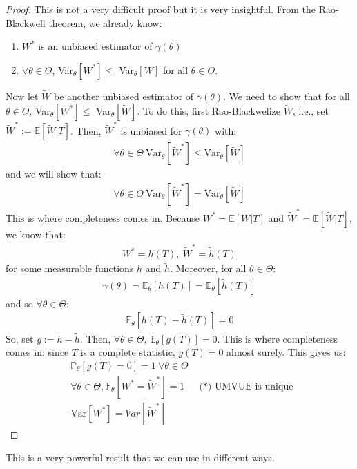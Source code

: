 \documentclass[11pt]{scrartcl}
\theoremstyle{definition}
\theoremstyle{remark}
\newcommand{\EX}[1]{\mathbb{E}\left[#1 \right]}
\newcommand{\EXth}[1]{\mathbb{E}_\theta \left[ #1 \right]}
\begin{document}
{\begin{proof}
	This is not a very difficult proof but it is very insightful. From the Rao-Blackwell theorem, we already know: 
	\begin{enumerate}[noitemsep]
		\item $W^*$ is an unbiased estimator of $\gamma ( \theta ) $
		\item $\forall \theta \in \Theta$, Var$_\theta [W^*] \leq $ Var$_\theta [W]$ for all $\theta \in \Theta$. 
	\end{enumerate}
	Now let $\widetilde{W}$ be another unbiased estimator of $\gamma ( \theta)$. We need to show that for all $\theta \in \Theta$, Var$_\theta [ W^*] \leq$ Var$_\theta [\widetilde{W} ]$. To do this, first Rao-Blackwelize $\widetilde{W}$, i.e., set $\widetilde{W}^* := \EX{ \widetilde{W} | T } $. Then, $\widetilde{W}^*$ is unbiased for $\gamma (\theta)$ with: 
	\begin{align*}
		\forall \theta \in \Theta\ \text{Var}_\theta [ \widetilde{W}^* ] \leq \text{Var}_\theta [ \widetilde{W} ]
	\end{align*}
	and we will show that: 
	\begin{align*}
		\forall \theta \in \Theta\ \text{Var}_\theta [ \widetilde{W}^*] =  \text{Var}_\theta [ \widetilde{W} ] 
	\end{align*}
	This is where completeness comes in. Because $W^* = \EX{W|T}$ and $\widetilde{W}^* = \EX{\widetilde{W} | T} $, we know that: 
	\begin{align*} 
		W^* = h(T),\ \widetilde{W}^* = \widetilde{h}(T) 
	\end{align*}
	for some measurable functions $h$ and $\widetilde{h}$. Moreover, for all $\theta \in \Theta$: 
	\begin{align*}
		\gamma(\theta) = \EXth{h(T)} = \EXth{\widetilde{h}(T)} 
	\end{align*}
	and so $\forall \theta \in \Theta$: 
	\begin{align*}
		\EXth{h(T) - \widetilde{h}(T)} = 0 
	\end{align*}
	So, set $g := h - \widetilde{h}$. Then, $\forall \theta \in \Theta$, $\EXth{g(T)} = 0$. This is where completeness comes in: since $T$ is a complete statistic, $g(T) = 0$ almost surely. This gives us: 
	\begin{align*}
		& \mathbb{P}_\theta [ g(T) = 0] = 1\ \forall \theta \in \Theta \\
		& \forall \theta \in \Theta, \mathbb{P}_\theta [ W^* = \widetilde{W}^*] = 1 & \text{ (*) UMVUE is unique } \\
		& \text{Var}[W^*] = Var[\widetilde{W}^*] 
	\end{align*}
\end{proof}
This is a very powerful result that we can use in different ways. 

}
\end{document}
